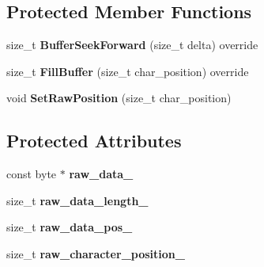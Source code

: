 \subsection*{Protected Member Functions}
\begin{DoxyCompactItemize}
\item 
size\+\_\+t {\bfseries Buffer\+Seek\+Forward} (size\+\_\+t delta) override\hypertarget{classv8_1_1internal_1_1_utf8_to_utf16_character_stream_af5d72355686afc4f7afc4709909de55c}{}\label{classv8_1_1internal_1_1_utf8_to_utf16_character_stream_af5d72355686afc4f7afc4709909de55c}

\item 
size\+\_\+t {\bfseries Fill\+Buffer} (size\+\_\+t char\+\_\+position) override\hypertarget{classv8_1_1internal_1_1_utf8_to_utf16_character_stream_aa2ff4d687aec1db0530f4052c6fce62f}{}\label{classv8_1_1internal_1_1_utf8_to_utf16_character_stream_aa2ff4d687aec1db0530f4052c6fce62f}

\item 
void {\bfseries Set\+Raw\+Position} (size\+\_\+t char\+\_\+position)\hypertarget{classv8_1_1internal_1_1_utf8_to_utf16_character_stream_ab5c801ee70307c8635dc8c14d0e0bbc3}{}\label{classv8_1_1internal_1_1_utf8_to_utf16_character_stream_ab5c801ee70307c8635dc8c14d0e0bbc3}

\end{DoxyCompactItemize}
\subsection*{Protected Attributes}
\begin{DoxyCompactItemize}
\item 
const byte $\ast$ {\bfseries raw\+\_\+data\+\_\+}\hypertarget{classv8_1_1internal_1_1_utf8_to_utf16_character_stream_a8e40f877bccff741ffa4205542607806}{}\label{classv8_1_1internal_1_1_utf8_to_utf16_character_stream_a8e40f877bccff741ffa4205542607806}

\item 
size\+\_\+t {\bfseries raw\+\_\+data\+\_\+length\+\_\+}\hypertarget{classv8_1_1internal_1_1_utf8_to_utf16_character_stream_ae420903333ac653584105528ee116daa}{}\label{classv8_1_1internal_1_1_utf8_to_utf16_character_stream_ae420903333ac653584105528ee116daa}

\item 
size\+\_\+t {\bfseries raw\+\_\+data\+\_\+pos\+\_\+}\hypertarget{classv8_1_1internal_1_1_utf8_to_utf16_character_stream_a8320b28233b907028809575e38c96426}{}\label{classv8_1_1internal_1_1_utf8_to_utf16_character_stream_a8320b28233b907028809575e38c96426}

\item 
size\+\_\+t {\bfseries raw\+\_\+character\+\_\+position\+\_\+}\hypertarget{classv8_1_1internal_1_1_utf8_to_utf16_character_stream_a6cc40698d35e96d1ba46dd65476c4096}{}\label{classv8_1_1internal_1_1_utf8_to_utf16_character_stream_a6cc40698d35e96d1ba46dd65476c4096}

\end{DoxyCompactItemize}
